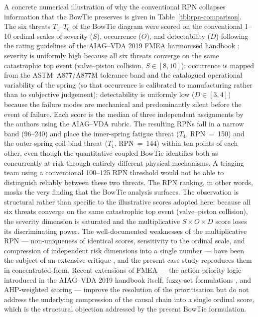 A concrete numerical illustration of why the conventional RPN
collapses information that the BowTie preserves is given in
Table~\ref{tbl:rpn-comparison}. The six threats $T_{1}$--$T_{6}$ of
the BowTie diagram were scored on the conventional 1--10 ordinal
scales of severity ($S$), occurrence ($O$), and detectability ($D$)
following the rating guidelines of the AIAG--VDA 2019 FMEA harmonised
handbook \citep{aiagvda2019fmea}: severity is uniformly high
because all six threats converge on the same catastrophic top event
(valve--piston collision, $S\in[8,10]$); occurrence is mapped from
the ASTM~A877/A877M tolerance band and the catalogued operational
variability of the spring (so that occurrence is calibrated to
manufacturing rather than to subjective judgement); detectability is
uniformly low ($D\in[3,4]$) because the failure modes are mechanical
and predominantly silent before the event of failure. Each score is
the median of three independent assignments by the authors using the
AIAG--VDA rubric. The resulting RPNs fall in a narrow band
(96--240) and place the inner-spring fatigue threat ($T_{4}$,
RPN~=~150) and the outer-spring coil-bind threat ($T_{1}$,
RPN~=~144) within ten points of each other, even though the
quantitative-coupled BowTie identifies both as concurrently at risk
through entirely different physical mechanisms. A triaging team
using a conventional 100--125 RPN threshold would not be able to
distinguish reliably between these two threats. The RPN ranking, in
other words, masks the very finding that the BowTie analysis
surfaces. The observation is structural rather than specific to the
illustrative scores adopted here: because all six threats converge
on the same catastrophic top event (valve--piston collision), the
severity dimension is saturated and the multiplicative
$S\times O\times D$ score loses its discriminating power. The
well-documented weaknesses of the multiplicative RPN ---
non-uniqueness of identical scores, sensitivity to the ordinal scale,
and compression of independent risk dimensions into a single
number --- have been the subject of an extensive critique
\citep{pillay2003modifiedfmea,liu2013fuzzyfmea}, and the
present case study reproduces them in concentrated form. Recent
extensions of FMEA --- the action-priority logic introduced in the
AIAG--VDA 2019 handbook itself, fuzzy-set formulations
\citep{liu2013fuzzyfmea,wang2009fuzzyAHP}, and AHP-weighted
scoring --- improve the resolution of the prioritisation but do not
address the underlying compression of the causal chain into a
single ordinal score, which is the structural objection addressed by
the present BowTie formulation.

